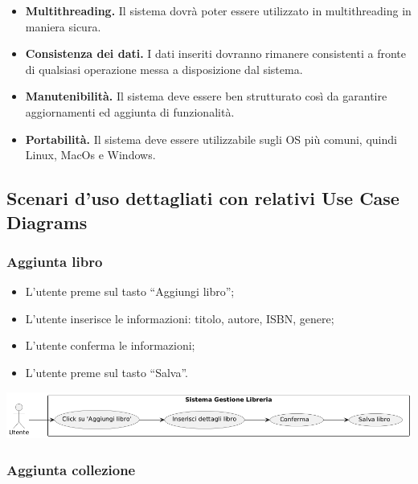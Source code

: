 \begin{itemize}
  \item
    \textbf{Multithreading.} Il sistema dovrà poter essere utilizzato in
    multithreading in maniera sicura.
  \item
    \textbf{Consistenza dei dati.} I dati inseriti dovranno rimanere
    consistenti a fronte di qualsiasi operazione messa a disposizione dal
    sistema.
  \item
    \textbf{Manutenibilità.} Il sistema deve essere ben strutturato così
    da garantire aggiornamenti ed aggiunta di funzionalità.
  \item
    \textbf{Portabilità.} Il sistema deve essere utilizzabile sugli OS più
    comuni, quindi Linux, MacOs e Windows.
\end{itemize}

\subsection{Scenari d'uso dettagliati con relativi Use Case
Diagrams}

\subsubsection{Aggiunta libro}\label{aggiunta-libro}

\begin{itemize}
  \item
    L'utente preme sul tasto ``Aggiungi libro'';
  \item
    L'utente inserisce le informazioni: titolo, autore, ISBN, genere;
  \item
    L'utente conferma le informazioni;
  \item
    L'utente preme sul tasto ``Salva''.
\end{itemize}

\begin{center}
  \includegraphics[width = \textwidth]{media/useCase1.png}
\end{center}

\subsubsection{Aggiunta collezione}\label{aggiunta-collezione}

